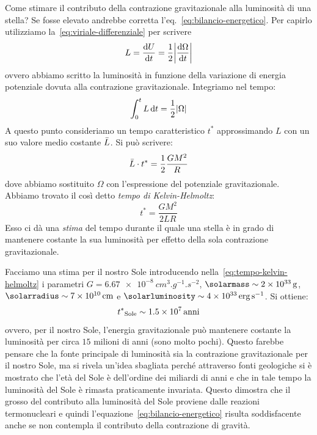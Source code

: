 Come stimare il contributo della contrazione gravitazionale alla luminosità di una stella? Se fosse elevato andrebbe corretta l'eq.~\eqref{eq:bilancio-energetico}. Per capirlo utilizziamo la~\eqref{eq:viriale-differenziale} per scrivere
\[
L = \frac{\ud U}{\ud t} = \frac{1}{2} \abs*{\frac{\ud \Omega}{\ud t}}
\]
ovvero abbiamo scritto la luminosità in funzione della variazione di energia potenziale dovuta alla contrazione gravitazionale. Integriamo nel tempo:
\[
\int_0^t L \mathop{\mathrm{{}d}}\mathopen{} t = \frac{1}{2} \lvert\Omega\rvert
\]
A questo punto consideriamo un tempo caratteristico $t^*$ approssimando $L$ con un suo valore medio costante $\Bar{L}$. Si può scrivere:
\[
\Bar{L} \cdot t^* = \frac{1}{2} \frac{GM^2}{R}
\]
dove abbiamo sostituito $\Omega$ con l'espressione del potenziale gravitazionale. Abbiamo trovato il così detto \emph{tempo di Kelvin-Helmoltz}:
\begin{equation}\label{eq:tempo-kelvin-helmoltz}
    t^* = \dfrac{GM^2}{2LR}
\end{equation}
Esso ci dà una \emph{stima} del tempo durante il quale una stella è in grado di  mantenere costante la sua luminosità per effetto della sola contrazione gravitazionale. 

Facciamo una stima per il nostro Sole introducendo nella~\eqref{eq:tempo-kelvin-helmoltz} i parametri $G = \SI{6.67e-8}{cm^3.g^{-1}.s^{-2}}$, $\si{\solarmass} \sim \SI{2e33}{g}$, $\si{\solarradius} \sim \SI{7e10}{cm}$ e $\si{\solarluminosity} \sim \SI{4e33}{erg.s^{-1}}$. Si ottiene:
\[
{t^*}_{\textup{Sole}} \sim \SI{1.5e7}{anni}
\]
ovvero, per il nostro Sole, l'energia gravitazionale può mantenere costante la luminosità per circa $15$ milioni di anni (sono molto pochi). Questo farebbe pensare che la fonte principale di luminosità sia la contrazione gravitazionale per il nostro Sole, ma si rivela un'idea sbagliata perché attraverso fonti geologiche si è mostrato che l'età del Sole è dell'ordine dei miliardi di anni e che in tale tempo la luminosità del Sole è rimasta praticamente invariata. Questo dimostra che il grosso del contributo alla luminosità del Sole proviene dalle reazioni termonucleari e quindi l'equazione~\eqref{eq:bilancio-energetico} risulta soddisfacente anche se non contempla il contributo della contrazione di gravità.